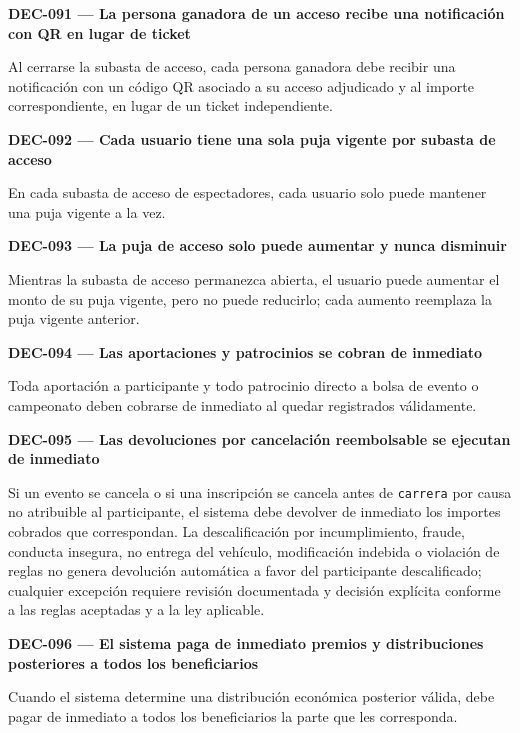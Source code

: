 \documentclass[10pt,letterpaper]{article}
\begin{document}
\noindent\textbf{DEC-091 --- La persona ganadora de un acceso recibe una notificación con QR en lugar de ticket}\par
Al cerrarse la subasta de acceso, cada persona ganadora debe recibir una notificación con un código QR asociado a su acceso adjudicado y al importe correspondiente, en lugar de un ticket independiente.\par\vspace{0.45em}
\noindent\textbf{DEC-092 --- Cada usuario tiene una sola puja vigente por subasta de acceso}\par
En cada subasta de acceso de espectadores, cada usuario solo puede mantener una puja vigente a la vez.\par\vspace{0.45em}
\noindent\textbf{DEC-093 --- La puja de acceso solo puede aumentar y nunca disminuir}\par
Mientras la subasta de acceso permanezca abierta, el usuario puede aumentar el monto de su puja vigente, pero no puede reducirlo; cada aumento reemplaza la puja vigente anterior.\par\vspace{0.45em}
\noindent\textbf{DEC-094 --- Las aportaciones y patrocinios se cobran de inmediato}\par
Toda aportación a participante y todo patrocinio directo a bolsa de evento o campeonato deben cobrarse de inmediato al quedar registrados válidamente.\par\vspace{0.45em}
\noindent\textbf{DEC-095 --- Las devoluciones por cancelación reembolsable se ejecutan de inmediato}\par
Si un evento se cancela o si una inscripción se cancela antes de \texttt{carrera} por causa no atribuible al participante, el sistema debe devolver de inmediato los importes cobrados que correspondan. La descalificación por incumplimiento, fraude, conducta insegura, no entrega del vehículo, modificación indebida o violación de reglas no genera devolución automática a favor del participante descalificado; cualquier excepción requiere revisión documentada y decisión explícita conforme a las reglas aceptadas y a la ley aplicable.\par\vspace{0.45em}
\noindent\textbf{DEC-096 --- El sistema paga de inmediato premios y distribuciones posteriores a todos los beneficiarios}\par
Cuando el sistema determine una distribución económica posterior válida, debe pagar de inmediato a todos los beneficiarios la parte que les corresponda.\par\vspace{0.45em}
\end{document}
